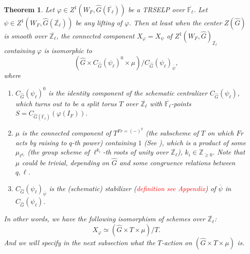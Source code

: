\documentclass{article}
\newcommand{\red}[1]{\textcolor{red}{#1}}
\newtheorem{theorem}{Theorem}
\begin{document}
\begin{theorem}
	Let $\varphi \in Z^1(W_F, \hat{G}(\overline{\mathbb{F}_{\ell}}))$ be a TRSELP over $\overline{\mathbb{F}_{\ell}}$. Let $\psi \in Z^1(W_F, \hat{G}(\overline{\mathbb{Z}_{\ell}}))$ be any lifting of $\varphi$. Then at least when the center $Z(\hat{G})$ is smooth over $\overline{\mathbb{Z}_{\ell}}$, the connected component $X_{\varphi}=X_{\psi}$ of $Z^1(W_F, \hat{G})_{\overline{\mathbb{Z}_{\ell}}}$ containing $\varphi$ is isomorphic to 
	$$\left(\hat{G} \times C_{\hat{G}}(\psi_{\ell})^0 \times \mu\right)/C_{\hat{G}}(\psi_{\ell})_{\overline{\psi}},$$
	where
	\begin{enumerate}
		\item $C_{\hat{G}}(\psi_{\ell})^0$ is the identity component of the schematic centralizer $C_{\hat{G}}(\psi_{\ell})$, which turns out to be a split torus $T$ over $\overline{\mathbb{Z}_{\ell}}$ with $\overline{\mathbb{F}_{\ell}}$-points $S=C_{\hat{G}(\overline{\mathbb{F}_{\ell}})}(\varphi(I_F))$.
		\item $\mu$ is the connected component of $T^{Fr=(-)^q}$ (the subscheme of $T$ on which $Fr$ acts by raising to $q$-th power) containing $1$ (See \cite[Example 3.14]{dat2022ihes}), which is a product of some $\mu_{\ell^{k_i}}$ (the group scheme of $\ell^{k_i}$-th roots of unity over $\overline{\mathbb{Z}_{\ell}}$), $k_i \in \mathbb{Z}_{\geq 0}$. Note that $\mu$ could be trivial, depending on $\hat{G}$ and some congruence relations between $q, \ell$.
		\item $C_{\hat{G}}(\psi_{\ell})_{\overline{\psi}}$ is the (schematic) stabilizer (\red{definition see Appendix}) of $\overline{\psi}$ in $C_{\hat{G}}(\psi_{\ell})$.
	\end{enumerate}
    In other words, we have the following isomorphism of schemes over $\overline{\mathbb{Z}_{\ell}}$:
    $$X_{\varphi} \simeq \left(\hat{G} \times T \times \mu\right)/T.$$
    And we will specify in the next subsection what the $T$-action on $\left(\hat{G} \times T \times \mu\right)$ is.
    

\end{theorem}
\end{document}
